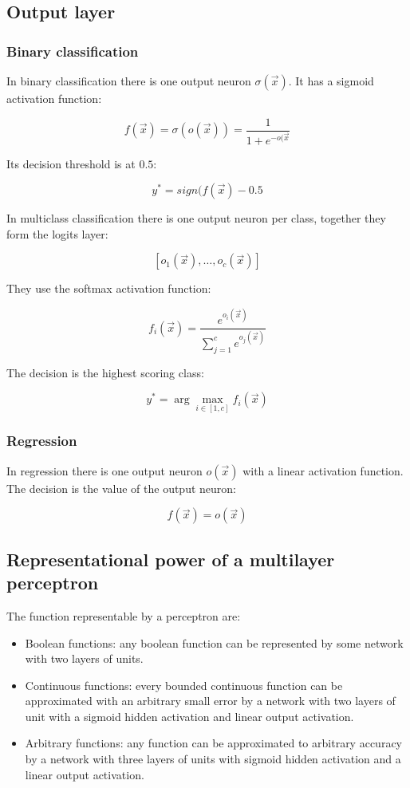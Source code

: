 	\subsection{Output layer}

		\subsubsection{Binary classification}
		In binary classification there is one output neuron $\sigma(\vec{x})$.
		It has a sigmoid activation function:

		$$f(\vec{x}) = \sigma(o(\vec{x})) = \frac{1}{1+e^{-o(\vec{x}}}$$

		Its decision threshold is at $0.5$:

		$$y^* = sign(f(\vec{x}) - 0.5$$

		In multiclass classification there is one output neuron per class, together they form the logits layer:

		$$[o_1(\vec{x}),\dots, o_c(\vec{x})]$$

		They use the softmax activation function:

		$$f_i(\vec{x}) = \frac{e^{o_i(\vec{x})}}{\sum\limits_{j=1}^ce^{o_j(\vec{x})}}$$

		The decision is the highest scoring class:

		$$y^* = \arg\max\limits_{i\in[1,c]}f_i(\vec{x})$$

		\subsubsection{Regression}
		In regression there is one output neuron $o(\vec{x})$ with a linear activation function.
		The decision is the value of the output neuron:

		$$f(\vec{x}) = o(\vec{x})$$

	\subsection{Representational power of a multilayer perceptron}
	The function representable by a perceptron are:

	\begin{multicols}{2}
		\begin{itemize}
			\item Boolean functions: any boolean function can be represented by some network with two layers of units.
			\item Continuous functions: every bounded continuous function can be approximated with an arbitrary small error by a network with two layers of unit with a sigmoid hidden activation and linear output activation.

			\item Arbitrary functions: any function can be approximated to arbitrary accuracy by a network with three layers of units with sigmoid hidden activation and a linear output activation.
		\end{itemize}
	\end{multicols}

